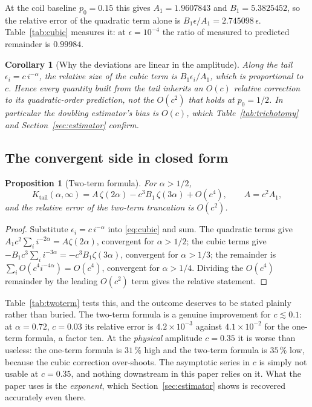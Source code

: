 \documentclass[11pt,reqno]{amsart}
\theoremstyle{plain}
\newtheorem{proposition}[theorem]{Proposition}
\newtheorem{corollary}[theorem]{Corollary}
\theoremstyle{definition}
\theoremstyle{remark}
\numberwithin{equation}{section}
\newcommand{\Kt}{K_{\mathrm{tail}}}
\begin{document}
At the coil baseline $p_0=0.15$ this gives $A_1=1.9607843$ and $B_1=5.3825452$, so the relative error of the quadratic term alone is $B_1\epsilon/A_1 = 2.745098\,\epsilon$. Table~\ref{tab:cubic} measures it: at $\epsilon=10^{-4}$ the ratio of measured to predicted remainder is $0.99984$.

\begin{corollary}[Why the deviations are linear in the amplitude]
\label{cor:oc}
Along the tail $\epsilon_i = c\,i^{-\alpha}$, the relative size of the cubic term is $B_1\epsilon_i/A_1$, which is proportional to $c$. Hence every quantity built from the tail inherits an $O(c)$ relative correction to its quadratic-order prediction, not the $O(c^2)$ that holds at $p_0=1/2$. In particular the doubling estimator's bias is $O(c)$, which Table~\ref{tab:trichotomy} and Section~\ref{sec:estimator} confirm.
\end{corollary}

\subsection{The convergent side in closed form}

\begin{proposition}[Two-term formula]
\label{prop:twoterm}
For $\alpha>1/2$,
\begin{equation}
\label{eq:twoterm}
\Kt(\alpha,\infty) = A\,\zeta(2\alpha) - c^3B_1\,\zeta(3\alpha) + O(c^4),
\qquad A = c^2A_1,
\end{equation}
and the relative error of the two-term truncation is $O(c^2)$.
\end{proposition}

\begin{proof}
Substitute $\epsilon_i=c\,i^{-\alpha}$ into \eqref{eq:cubic} and sum. The quadratic terms give $A_1c^2\sum_i i^{-2\alpha}=A\zeta(2\alpha)$, convergent for $\alpha>1/2$; the cubic terms give $-B_1c^3\sum_i i^{-3\alpha}=-c^3B_1\zeta(3\alpha)$, convergent for $\alpha>1/3$; the remainder is $\sum_i O(c^4i^{-4\alpha})=O(c^4)$, convergent for $\alpha>1/4$. Dividing the $O(c^4)$ remainder by the leading $O(c^2)$ term gives the relative statement.
\end{proof}

Table~\ref{tab:twoterm} tests this, and the outcome deserves to be stated plainly rather than buried. The two-term formula is a genuine improvement for $c\lesssim0.1$: at $\alpha=0.72$, $c=0.03$ its relative error is $4.2\times10^{-3}$ against $4.1\times10^{-2}$ for the one-term formula, a factor ten. At the \emph{physical} amplitude $c=0.35$ it is worse than useless: the one-term formula is $31\,\%$ high and the two-term formula is $35\,\%$ low, because the cubic correction over-shoots. The asymptotic series in $c$ is simply not usable at $c=0.35$, and nothing downstream in this paper relies on it. What the paper uses is the \emph{exponent}, which Section~\ref{sec:estimator} shows is recovered accurately even there.
\end{document}
